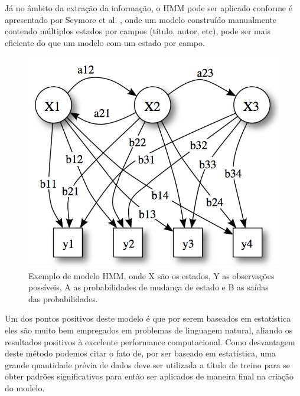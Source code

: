 Já no âmbito da extração da informação, o HMM pode ser aplicado conforme é apresentado por Seymore et al. \cite{Seymore-HMM-IE}, onde um modelo construído manualmente contendo múltiplos estados por campos (título, autor, etc), pode ser mais eficiente do que um modelo com um estado por campo. 


\begin{figure}
    \centering
    \caption{Exemplo de modelo HMM, onde X são os estados, Y as observações possíveis, A as probabilidades de mudança de estado e B as saídas das probabilidades.}
    \label{fig:hmm-states}
    \includegraphics[width=0.7\linewidth]{./assets/images/hmm-states}
\end{figure}

\begin{textedited}
Um dos pontos positivos deste modelo é que por serem baseados em estatística eles são muito bem empregados em problemas de linguagem natural, aliando os resultados positivos à excelente performance computacional. Como desvantagem deste método podemos citar o fato de, por ser baseado em estatística, uma grande quantidade prévia de dados deve ser utilizada a título de treino para se obter padrões significativos para então ser aplicados de maneira final na criação do modelo.
\end{textedited}

